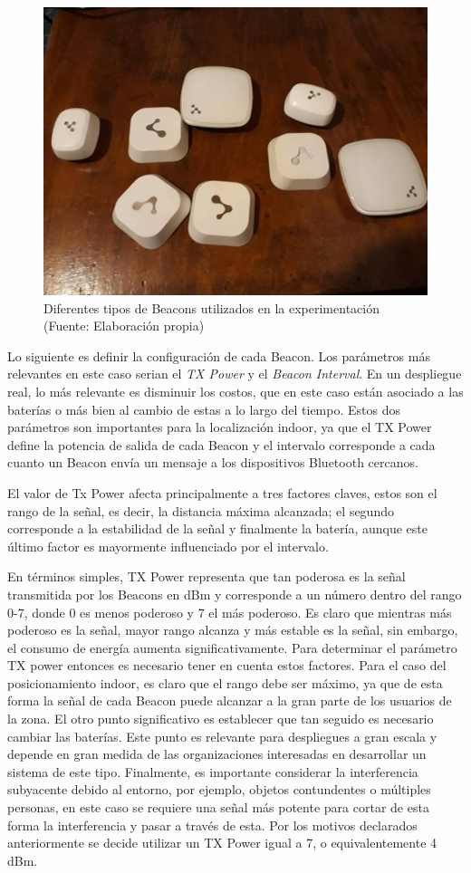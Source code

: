\begin{figure}[ht!]
\centering
\includegraphics[width=.6\textwidth]{figures/beacons_all.jpg}
\caption[Beacons utilizados en la experimentación]{Diferentes tipos de Beacons utilizados en la experimentación \\
{\scriptsize (Fuente: Elaboración propia)}}
\label{fig:beacons}
\end{figure}

Lo siguiente es definir la configuración de cada Beacon. Los parámetros más relevantes en este caso serian el \textit{TX Power} y el \textit{Beacon Interval}. En un despliegue real, lo más relevante es disminuir los costos, que en este caso están asociado a las baterías o más bien al cambio de estas a lo largo del tiempo. Estos dos parámetros son importantes para la localización indoor, ya que el TX Power define la potencia de salida de cada Beacon y el intervalo corresponde a cada cuanto un Beacon envía un mensaje a los dispositivos Bluetooth cercanos. 

El valor de Tx Power afecta principalmente a tres factores claves, estos son el rango de la señal, es decir, la distancia máxima alcanzada; el segundo corresponde a la estabilidad de la señal y finalmente la batería, aunque este último factor es mayormente influenciado por el intervalo.

En términos simples, TX Power representa que tan poderosa es la señal transmitida por los Beacons en dBm y corresponde a un número dentro del rango 0-7, donde 0 es menos poderoso y 7 el más poderoso. Es claro que mientras más poderoso es la señal, mayor rango alcanza y más estable es la señal, sin embargo, el consumo de energía aumenta significativamente. Para determinar el parámetro TX power entonces es necesario tener en cuenta estos factores. Para el caso del posicionamiento indoor, es claro que el rango debe ser máximo, ya que de esta forma la señal de cada Beacon puede alcanzar a la gran parte de los usuarios de la zona. El otro punto significativo es establecer que tan seguido es necesario cambiar las baterías. Este punto es relevante para despliegues a gran escala y depende en gran medida de las organizaciones interesadas en desarrollar un sistema de este tipo. Finalmente, es importante considerar la interferencia subyacente debido al entorno, por ejemplo, objetos contundentes o múltiples personas, en este caso se requiere una señal más potente para cortar de esta forma la interferencia y pasar a través de esta. Por los motivos declarados anteriormente se decide utilizar un TX Power igual a 7, o equivalentemente 4 dBm.

